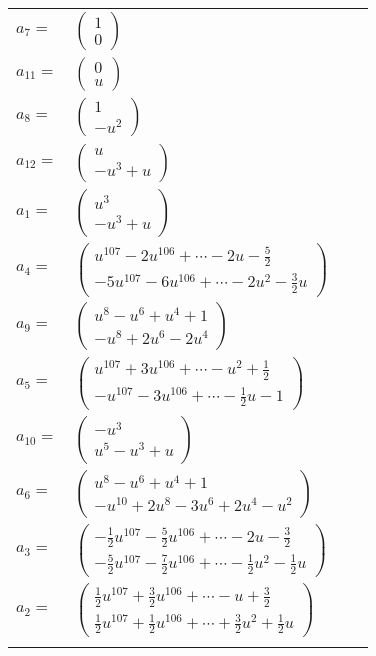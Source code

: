 \documentclass[1p]{elsarticle_modified}
\theoremstyle{definition}
\begin{document}
\begin{tabular}{m{7pt} m{180pt} m{7pt} m{180pt} }
\flushright $a_{7}=$&$\begin{pmatrix}1\\0\end{pmatrix}$ \\
\flushright $a_{11}=$&$\begin{pmatrix}0\\u\end{pmatrix}$ \\
\flushright $a_{8}=$&$\begin{pmatrix}1\\- u^2\end{pmatrix}$ \\
\flushright $a_{12}=$&$\begin{pmatrix}u\\- u^3+u\end{pmatrix}$ \\
\flushright $a_{1}=$&$\begin{pmatrix}u^3\\- u^3+u\end{pmatrix}$ \\
\flushright $a_{4}=$&$\begin{pmatrix}u^{107}-2 u^{106}+\cdots-2 u-\frac{5}{2}\\-5 u^{107}-6 u^{106}+\cdots-2 u^2-\frac{3}{2} u\end{pmatrix}$ \\
\flushright $a_{9}=$&$\begin{pmatrix}u^8- u^6+u^4+1\\- u^8+2 u^6-2 u^4\end{pmatrix}$ \\
\flushright $a_{5}=$&$\begin{pmatrix}u^{107}+3 u^{106}+\cdots- u^2+\frac{1}{2}\\- u^{107}-3 u^{106}+\cdots-\frac{1}{2} u-1\end{pmatrix}$ \\
\flushright $a_{10}=$&$\begin{pmatrix}- u^3\\u^5- u^3+u\end{pmatrix}$ \\
\flushright $a_{6}=$&$\begin{pmatrix}u^8- u^6+u^4+1\\- u^{10}+2 u^8-3 u^6+2 u^4- u^2\end{pmatrix}$ \\
\flushright $a_{3}=$&$\begin{pmatrix}-\frac{1}{2} u^{107}-\frac{5}{2} u^{106}+\cdots-2 u-\frac{3}{2}\\-\frac{5}{2} u^{107}-\frac{7}{2} u^{106}+\cdots-\frac{1}{2} u^2-\frac{1}{2} u\end{pmatrix}$ \\
\flushright $a_{2}=$&$\begin{pmatrix}\frac{1}{2} u^{107}+\frac{3}{2} u^{106}+\cdots- u+\frac{3}{2}\\\frac{1}{2} u^{107}+\frac{1}{2} u^{106}+\cdots+\frac{3}{2} u^2+\frac{1}{2} u\end{pmatrix}$\\&\end{tabular}
\end{document}
